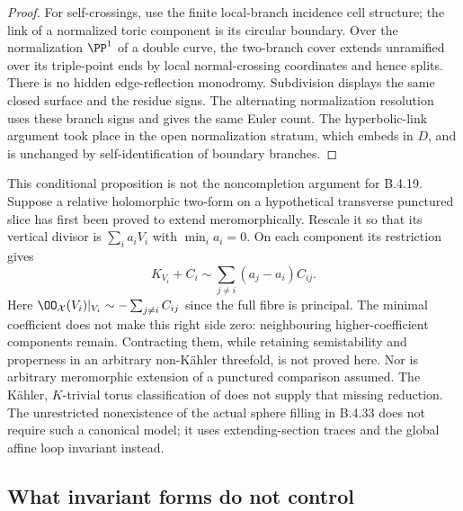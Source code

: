 \begin{proof}
For self-crossings, use the finite local-branch
incidence cell structure; the link of a normalized
toric component is its circular boundary. Over the
normalization $\PP^1$ of a double curve, the two-branch
cover extends unramified over its triple-point ends
by local normal-crossing coordinates and hence splits.
There is no hidden edge-reflection monodromy. Subdivision
displays the same closed surface and the residue signs.
The alternating normalization resolution uses these
branch signs and gives the same Euler count. The
hyperbolic-link argument took place in the open
normalization stratum, which embeds in $D$, and is
unchanged by self-identification of boundary branches.
\end{proof}

\begin{remark}
This conditional proposition is not the noncompletion
argument for B.4.19. Suppose a relative holomorphic two-form
on a hypothetical transverse punctured slice has first
been proved to extend meromorphically. Rescale it so
that its vertical divisor is $\sum_i a_iV_i$ with
$\min_i a_i=0$. On each component its restriction gives
\[
 K_{V_i}+C_i\sim\sum_{j\ne i}(a_j-a_i)C_{ij}.          \tag{B.4.28.11}
\]
Here $\OO_{\mathcal X}(V_i)|_{V_i}\sim
-\sum_{j\ne i}C_{ij}$ since the full fibre is principal.
The minimal coefficient does not make this right side
zero: neighbouring higher-coefficient components remain.
Contracting them, while retaining semistability and
properness in an arbitrary non-K\"ahler threefold, is
not proved here. Nor is arbitrary meromorphic extension
of a punctured comparison assumed. The K\"ahler,
$K$-trivial torus classification of
\citet[Theorem 3.1]{KamenovaToriRoot} does not supply
that missing reduction. The unrestricted nonexistence
of the actual sphere filling in B.4.33 does not require
such a canonical model; it uses extending-section traces
and the global affine loop invariant instead.
\end{remark}


\subsection{What invariant forms do not control}

